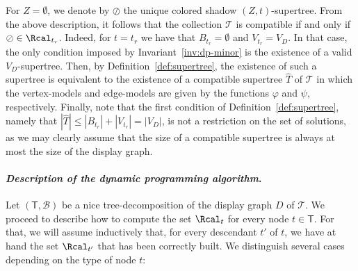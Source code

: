 \smallskip

 For $Z=\emptyset$, we denote by $\oslash$ the unique colored shadow $(Z,t)$-supertree. From the above description, it follows that the collection $\mathcal{T}$ is compatible  if and only if $\oslash \in \Rcal_{t_r}$. Indeed, for $t = t_r$ we have that $B_{t_r} = \emptyset$ and $V_{t_r} = V_D$. In that case, the only condition imposed by Invariant~\ref{inv:dp-minor} is the existence of a valid $V_D$-supertree. Then, by Definition~\ref{def:supertree}, the existence of such a supertree is equivalent to the existence of a compatible supertree $\widehat{T}$ of $\mathcal{T}$ in which the vertex-models and edge-models are given by the functions $\varphi$ and $\psi$, respectively. Finally, note that the first condition of Definition~\ref{def:supertree}, namely that $|\widehat{T}| \leq |B_{t_r}| + |V_{t_r}|  = |V_D|$, is not a restriction on the set of solutions, as we may clearly assume that the size of a compatible supertree is always at most the size of the display graph.






\paragraph{\textbf{\emph{Description of the dynamic programming algorithm}}.} Let $(\mathsf{T},\mathcal{B})$ be a nice tree-decomposition of the display graph $D$ of $\mathcal{T}$. We proceed to describe how to compute the set $\Rcal_t$  for every node $t\in\mathsf{T}$. For that, we will assume inductively that, for every descendant $t'$ of $t$, we have at hand the set $\Rcal_{t'}$ that has been correctly built.  We distinguish several cases depending on the type of node $t$:


